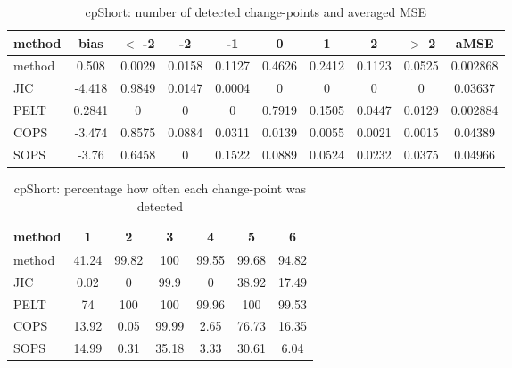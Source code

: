 \begin{table}[ht]
\centering
\begin{tabular}{l|c|ccccccc|c}
  \hline
method & bias & $<$ -2 & -2 & -1 & 0 & 1 & 2 & $>$ 2 & aMSE \\ 
  \hline
method & 0.508 & 0.0029 & 0.0158 & 0.1127 & 0.4626 & 0.2412 & 0.1123 & 0.0525 & 0.002868 \\ 
  JIC & -4.418 & 0.9849 & 0.0147 & 0.0004 &     0 &     0 &     0 &     0 & 0.03637 \\ 
  PELT & 0.2841 &     0 &     0 &     0 & 0.7919 & 0.1505 & 0.0447 & 0.0129 & 0.002884 \\ 
  COPS & -3.474 & 0.8575 & 0.0884 & 0.0311 & 0.0139 & 0.0055 & 0.0021 & 0.0015 & 0.04389 \\ 
  SOPS & -3.76 & 0.6458 &     0 & 0.1522 & 0.0889 & 0.0524 & 0.0232 & 0.0375 & 0.04966 \\ 
   \hline
\end{tabular}
\caption{cpShort: number of detected change-points and averaged MSE} 
\label{tab:cpShortNjumps}
\end{table}
\begin{table}[ht]
\centering
\begin{tabular}{l|cccccc}
  \hline
method & 1 & 2 & 3 & 4 & 5 & 6 \\ 
  \hline
method &  41.24 &  99.82 &    100 &  99.55 &  99.68 &  94.82 \\ 
  JIC &   0.02 &      0 &   99.9 &      0 &  38.92 &  17.49 \\ 
  PELT &     74 &    100 &    100 &  99.96 &    100 &  99.53 \\ 
  COPS &  13.92 &   0.05 &  99.99 &   2.65 &  76.73 &  16.35 \\ 
  SOPS &  14.99 &   0.31 &  35.18 &   3.33 &  30.61 &   6.04 \\ 
   \hline
\end{tabular}
\caption{cpShort: percentage how often each change-point was detected} 
\label{tab:cpShortDetections}
\end{table}

